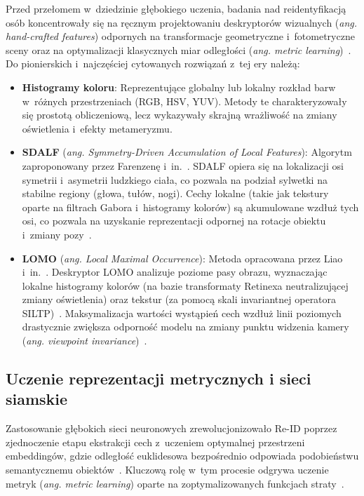 Przed przełomem w~dziedzinie głębokiego uczenia, badania nad reidentyfikacją osób koncentrowały się
na ręcznym projektowaniu deskryptorów wizualnych (\textit{ang. hand-crafted features}) odpornych na
transformacje geometryczne i~fotometryczne sceny oraz na optymalizacji klasycznych miar odległości
(\textit{ang. metric learning})~\cite{zheng2016person}. Do pionierskich i~najczęściej cytowanych
rozwiązań z~tej ery należą:
\begin{itemize}
  \item \textbf{Histogramy koloru}: Reprezentujące globalny lub lokalny rozkład barw w~różnych przestrzeniach (RGB, HSV, YUV). Metody te charakteryzowały się prostotą obliczeniową, lecz wykazywały skrajną wrażliwość na zmiany oświetlenia i~efekty metameryzmu.
  \item \textbf{SDALF} (\textit{ang. Symmetry-Driven Accumulation of Local Features}): Algorytm zaproponowany przez Farenzenę i~in.~\cite{farenzena2010person}. SDALF opiera się na lokalizacji osi symetrii i~asymetrii ludzkiego ciała, co pozwala na podział sylwetki na stabilne regiony (głowa, tułów, nogi). Cechy lokalne (takie jak tekstury oparte na filtrach Gabora i~histogramy kolorów) są akumulowane wzdłuż tych osi, co pozwala na uzyskanie reprezentacji odpornej na rotacje obiektu i~zmiany pozy~\cite{farenzena2010person}.
  \item \textbf{LOMO} (\textit{ang. Local Maximal Occurrence}): Metoda opracowana przez Liao i~in.~\cite{liao2015person}. Deskryptor LOMO analizuje poziome pasy obrazu, wyznaczając lokalne histogramy kolorów (na bazie transformaty Retinexa neutralizującej zmiany oświetlenia) oraz tekstur (za pomocą skali invariantnej operatora SILTP)~\cite{liao2015person}. Maksymalizacja wartości wystąpień cech wzdłuż linii poziomych drastycznie zwiększa odporność modelu na zmiany punktu widzenia kamery (\textit{ang. viewpoint invariance})~\cite{liao2015person}.
\end{itemize}

\subsection{Uczenie reprezentacji metrycznych i sieci siamskie}
\label{subsec:metric_learning_reid}

Zastosowanie głębokich sieci neuronowych zrewolucjonizowało Re-ID poprzez zjednoczenie etapu
ekstrakcji cech z~uczeniem optymalnej przestrzeni embeddingów, gdzie odległość euklidesowa
bezpośrednio odpowiada podobieństwu semantycznemu obiektów~\cite{hermans2017defense}. Kluczową rolę
w~tym procesie odgrywa uczenie metryk (\textit{ang. metric learning}) oparte na zoptymalizowanych
funkcjach straty~\cite{hermans2017defense}.

